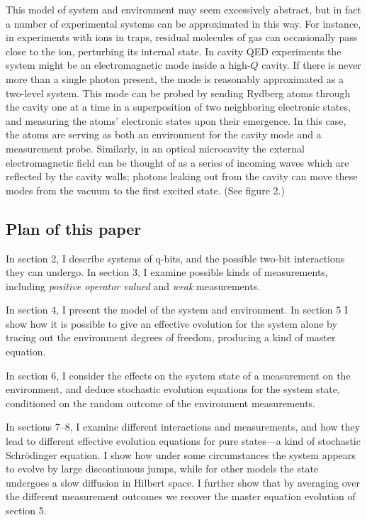\documentclass[12pt]{article}
\begin{document}
This model of system and environment may seem excessively abstract,
but in fact a number of experimental systems can be approximated in this
way.  For instance, in experiments with ions in traps, residual molecules
of gas can occasionally pass close to the ion, perturbing its internal
state.  In cavity QED experiments the system might be an electromagnetic
mode inside a high-$Q$ cavity.  If there is never more than a single
photon present, the mode is reasonably approximated as a two-level system.
This mode can be probed by sending Rydberg atoms through the cavity one at
a time in a superposition of two neighboring electronic states,
and measuring the atoms' electronic states upon their emergence.  In this
case, the atoms are serving as both an environment for the cavity mode
and a measurement probe.  Similarly, in an optical microcavity the
external electromagnetic field can be thought of as a series of incoming
waves which are reflected by the cavity walls; photons leaking out from the
cavity can move these modes from the vacuum to the first excited state.
(See figure 2.)

\subsection{Plan of this paper}

In section 2, I describe systems of q-bits, and the possible
two-bit interactions they can undergo.  In section 3, I examine possible
kinds of measurements, including {\it positive operator valued} and
{\it weak} measurements.

In section 4, I present the model of the system and environment.  In
section 5 I show how it is possible to give an effective evolution
for the system alone by tracing out the environment degrees of freedom,
producing a kind of master equation.

In section 6, I consider the effects on the system state of a measurement on
the environment, and deduce stochastic evolution equations for the system
state, conditioned on the random outcome of the environment measurements.

In sections 7--8, I examine different interactions and measurements,
and how they lead to different effective evolution equations for pure
states---a kind of stochastic Schr\"odinger equation.
I show how under some circumstances the system appears to evolve by
large discontinuous jumps, while for other models the state undergoes
a slow diffusion in Hilbert space.  I further show that by averaging over
the different measurement outcomes we recover the master equation evolution
of section 5.
\end{document}
